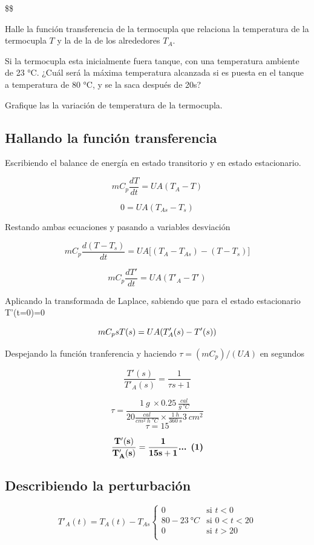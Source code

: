 \documentclass[
  letterpaper,
  DIV=11,
  numbers=noendperiod]{scrreprt}
\begin{document}
\$\$

Halle la función transferencia de la termocupla que relaciona la
temperatura de la termocupla \(T\) y la de la de los alrededores
\(T_A\).

Si la termocupla esta inicialmente fuera tanque, con una temperatura
ambiente de 23 °C. ¿Cuál será la máxima temperatura alcanzada si es
puesta en el tanque a temperatura de 80 °C, y se la saca después de 20s?

Grafique las la variación de temperatura de la termocupla.

\hypertarget{hallando-la-funciuxf3n-transferencia}{%
\subsection{Hallando la función
transferencia}\label{hallando-la-funciuxf3n-transferencia}}

Escribiendo el balance de energía en estado transitorio y en estado
estacionario.

\[
mC_p\frac{dT}{dt}=UA(T_A-T)
\]

\[
0=UA(T_{As}-T_s)
\]

Restando ambas ecuaciones y pasando a variables desviación

\[
m C_p \frac{d(T-T_s)}{dt}=UA\big[(T_A-T_{As})-(T-T_s)\big]
\]

\[
mC_p\frac{dT'}{dt}=UA(T'_A-T')
\]

Aplicando la transformada de Laplace, sabiendo que para el estado
estacionario T'(t=0)=0

\[
mC_ps\space T(s)=UA(T'_A(s)-T'(s))
\]

Despejando la función tranferencia y haciendo \(\tau = (mC_p)/(UA)\) en
segundos

\[
\frac{T'(s)}{T'_A(s)}=\frac{1}{\tau s+1}
\]

\[
\tau = \frac{1\ g\ \times 0.25\ \frac{cal}{g\ °C}}{20\frac{cal}{cm^2\ h\ °C}\times \frac{1\ h}{360\ s}3\ cm^2}
\] \[
\tau = 15
\]

\[
\mathbf{\frac{T'(s)}{T'_A(s)}=\frac{1}{15 s+1}}\space\space\space\space\textbf{... (1)}
\]

\hypertarget{describiendo-la-perturbaciuxf3n}{%
\subsection{Describiendo la
perturbación}\label{describiendo-la-perturbaciuxf3n}}

\[
T'_A(t)= T_A(t)-T_{As}
\begin{cases}
   0 &\text{si } t < 0 \\
   80-23\ °C &\text{si } 0< t < 20\\
   0 &\text{si } t>20\\
\end{cases}
\]
\end{document}
